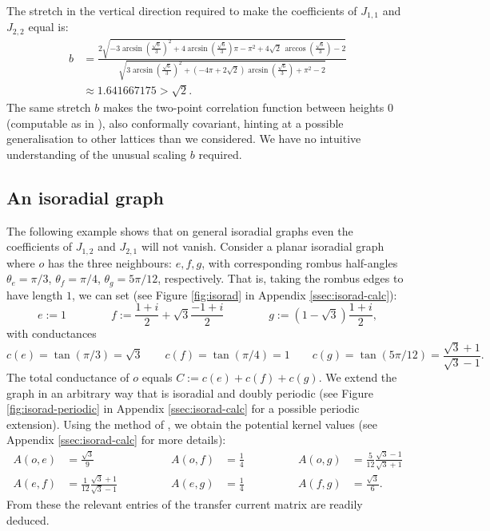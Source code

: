 \documentclass[11pt]{article}
\theoremstyle{remark}
\newcommand{\eqnst}[1]{\begin{equation*}#1\end{equation*}}
\newcommand{\eqnsplst}[1]{\begin{equation*}\begin{split}%
   #1\end{split}\end{equation*}}
\begin{document}
The stretch in the vertical direction required to make the coefficients of
$J_{1,1}$ and $J_{2,2}$ equal is:
\eqnsplst{ 
   b 
   &= \frac{2 \sqrt{-3 \arcsin\! \left(\frac{\sqrt{6}}{3}\right)^{2}+4 \arcsin\! \left(\frac{\sqrt{6}}{3}\right) \pi -\pi^{2}+4 \sqrt{2}\, \arccos\! \left(\frac{\sqrt{6}}{3}\right)-2}}{\sqrt{3 \arcsin\! \left(\frac{\sqrt{6}}{3}\right)^{2}+\left(-4 \pi +2 \sqrt{2}\right) \arcsin\! \left(\frac{\sqrt{6}}{3}\right)+\pi^{2}-2}} \\
   &\approx  1.641667175 
   > \sqrt{2}. }
The same stretch $b$ makes the two-point correlation function between heights $0$
(computable as in \cite{Durre2009}), also conformally covariant, hinting at a possible
generalisation to other lattices than we considered. We have no intuitive understanding
of the unusual scaling $b$ required.


\subsection{An isoradial graph}
\label{ssec:isorad}

The following example shows that on general isoradial graphs \cite{K02} even the coefficients of 
$J_{1,2}$ and $J_{2,1}$ will not vanish. Consider a planar isoradial graph 
where $o$ has the three neighbours: $e, f, g$, with corresponding rombus half-angles
$\theta_e = \pi/3$, $\theta_f = \pi/4$, $\theta_g = 5\pi/12$, respectively. 
That is, taking the rombus edges to have length $1$, we 
can set (see Figure \ref{fig:isorad} in Appendix \ref{ssec:isorad-calc}):
\eqnst{
  e:= 1 \qquad\qquad f := \frac{1+i}{2} + \sqrt{3} \frac{-1+i}{2} \qquad\qquad
    g:= (1-\sqrt{3}) \frac{1+i}{2}, }
with conductances 
\eqnst{
  c(e) = \tan(\pi/3) = \sqrt{3} \qquad 
  c(f) = \tan(\pi/4) = 1 \qquad 
  c(g) = \tan(5 \pi/12) = \frac{\sqrt{3}+1}{\sqrt{3}-1}. }
The total conductance of $o$ equals $C := c(e) + c(f) + c(g)$.
We extend the graph in an arbitrary way that is isoradial and doubly periodic
(see Figure \ref{fig:isorad-periodic} in Appendix \ref{ssec:isorad-calc} for a 
possible periodic extension).
Using the method of \cite[Theorem7.1]{K02}, we obtain the potential kernel values (see 
Appendix \ref{ssec:isorad-calc} for more details):
\begin{align*}
  A(o,e) &= \frac{\sqrt{3}}{9} \qquad&\qquad 
  A(o,f) &= \frac{1}{4} \qquad&\qquad 
  A(o,g) &= \frac{5}{12} \frac{\sqrt{3}-1}{\sqrt{3}+1} \\
  A(e,f) &= \frac{1}{12} \frac{\sqrt{3}+1}{\sqrt{3}-1} \qquad&\qquad
  A(e,g) &= \frac{1}{4} \qquad&\qquad 
  A(f,g) &= \frac{\sqrt{3}}{6}. 
\end{align*}
From these the relevant entries of the transfer current matrix are readily deduced. 
\end{document}
